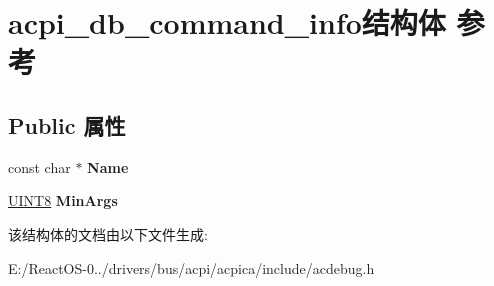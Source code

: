 \hypertarget{structacpi__db__command__info}{}\section{acpi\+\_\+db\+\_\+command\+\_\+info结构体 参考}
\label{structacpi__db__command__info}
\subsection*{Public 属性}
\begin{DoxyCompactItemize}
\item 
\mbox{\label{structacpi__db__command__info_a8151e3d29670fae8bda5f10e1a33450b}} 
const char $\ast$ {\bfseries Name}
\item 
\mbox{\label{structacpi__db__command__info_aaa779d625186017667b34f6f3f67a190}} 
\hyperlink{_processor_bind_8h_ab27e9918b538ce9d8ca692479b375b6a}{U\+I\+N\+T8} {\bfseries Min\+Args}
\end{DoxyCompactItemize}


该结构体的文档由以下文件生成\+:\begin{DoxyCompactItemize}
\item 
E\+:/\+React\+O\+S-\/0../drivers/bus/acpi/acpica/include/acdebug.\+h\end{DoxyCompactItemize}
